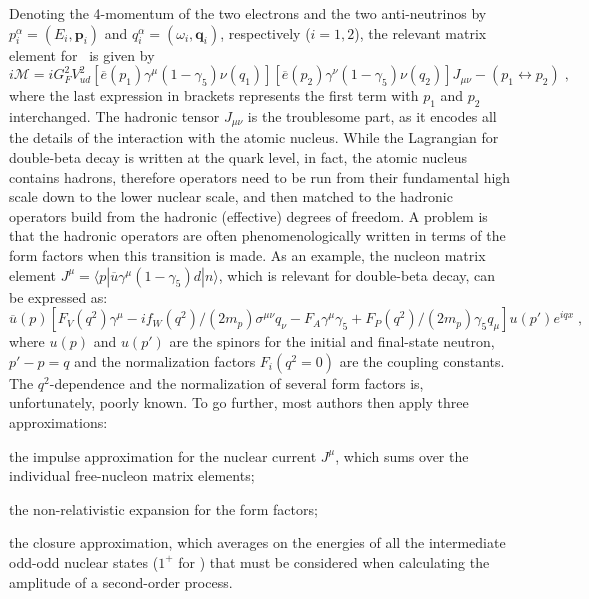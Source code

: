 Denoting the 4-momentum of the two electrons and the two anti-neutrinos by
$p^\alpha_i = (E_i,\mathbf{p}_i)$ and $q^\alpha_i = (\omega_i,\mathbf{q}_i)$,
respectively ($i=1,2$), the relevant matrix element for \nnbb\ is given by
\[
  i\mathcal{M} = iG^2_F V^2_{ud}
                 [\overline{e}(p_1) \gamma^\mu (1-\gamma_5) \nu(q_1)]
                 [\overline{e}(p_2) \gamma^\nu (1-\gamma_5) \nu(q_2)]
                 J_{\mu\nu} - (p_1\leftrightarrow p_2) \;,
\]
where the last expression in brackets represents the first term with $p_1$ and
$p_2$ interchanged. The hadronic tensor $J_{\mu\nu}$ is the troublesome part,
as it encodes all the details of the interaction with the atomic nucleus. While
the Lagrangian for double-beta decay is written at the quark level, in fact,
the atomic nucleus contains hadrons, therefore operators need to be run from
their fundamental high scale down to the lower nuclear scale, and then matched
to the hadronic operators build from the hadronic (effective) degrees of
freedom. A problem is that the hadronic operators are often phenomenologically
written in terms of the form factors when this transition is made. As an
example, the nucleon matrix element $J^\mu = \langle{p}| \overline{u}
\gamma^\mu (1-\gamma_5) d |{n}\rangle$, which is relevant for double-beta
decay, can be expressed as:
\[
  \overline{u}(p) \left[
    F_V(q^2)\gamma^\mu
    - if_W(q^2)/(2m_p) \sigma^{\mu\nu} q_\nu
    - F_A\gamma^\mu\gamma_5
    + F_P(q^2)/(2m_p)\gamma_5q_\mu
  \right] u(p')e^{iqx} \;,
\]
where $u(p)$ and $u(p')$ are the spinors for the initial and final-state
neutron, $p'-p=q$ and the normalization factors $F_i(q^2=0)$ are the coupling
constants. The $q^2$-dependence and the normalization of several form factors
is, unfortunately, poorly known.  To go further, most authors then apply three
approximations:
\begin{inparaenum}[\itshape a)]
  \item the impulse approximation for the nuclear current $J^\mu$, which sums
    over the individual free-nucleon matrix elements;
  \item the non-relativistic expansion for the form factors;
  \item the closure approximation, which averages on the energies of all the
    intermediate odd-odd nuclear states ($1^+$ for \nnbb) that must be
    considered when calculating the amplitude of a second-order process. 
\end{inparaenum}
